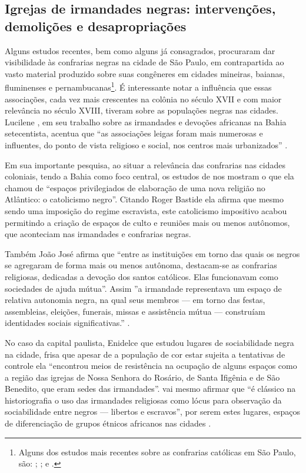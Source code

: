 \begin{refsection}
    \section{Igrejas de irmandades negras: intervenções, demolições e desapropriações}

    Alguns estudos recentes, bem como alguns já consagrados, procuraram dar visibilidade às confrarias negras na cidade de São Paulo, em contrapartida ao vasto material produzido sobre suas congêneres em cidades mineiras, baianas, fluminenses e pernambucanas\footnote{Alguns dos estudos mais recentes sobre as confrarias católicas em São Paulo, são: ; ; e .}. É interessante notar a influência que essas associações, cada vez mais crescentes na colônia no século XVII e com maior relevância no século XVIII, tiveram sobre as populações negras nas cidades. Lucilene \textcite{Reginaldo2011Rosarios}, em seu trabalho sobre as irmandades e devoções africanas na Bahia setecentista, acentua que ``as associações leigas foram mais numerosas e influentes, do ponto de vista religioso e social, nos centros mais urbanizados'' \cite[p.~25]{Reginaldo2011Rosarios}.

    Em sua importante pesquisa, ao situar a relevância das confrarias nas cidades coloniais, tendo a Bahia como foco central, os estudos de \textcite{Reginaldo2011Rosarios} nos mostram o que ela chamou de ``espaços privilegiados de elaboração de uma nova religião no Atlântico: o catolicismo negro''. Citando Roger Bastide ela afirma que mesmo sendo uma imposição do regime escravista, este catolicismo impositivo acabou permitindo a criação de espaços de culto e reuniões mais ou menos autônomos, que aconteciam nas irmandades e confrarias negras.
    
    Também João José \textcite{Reis1996Identidade} afirma que ``entre as instituições em torno das quais os negros se agregaram de forma mais ou menos autônoma, destacam-se as confrarias religiosas, dedicadas a devoção dos santos católicos. Elas funcionavam como sociedades de ajuda mútua''. Assim ''a irmandade representava um espaço de relativa autonomia negra, na qual seus membros --- em torno das festas, assembleias, eleições, funerais, missas e assistência mútua --- construíam identidades sociais significativas.'' \cite[p.~44]{Reis1996Identidade}.
    
    No caso da capital paulista, Enidelce \textcite{Bertin2010Sociabilidade} que estudou lugares de sociabilidade negra na cidade, frisa que apesar de a população de cor estar sujeita a tentativas de controle ela ``encontrou meios de resistência na ocupação de alguns espaços como a região das igrejas de Nossa Senhora do Rosário, de Santa Ifigênia e de São Benedito, que eram sedes das irmandades''. \textcite{Bertin2010Sociabilidade} vai mesmo afirmar que ``é clássico na historiografia o uso das irmandades religiosas como lócus para observação da sociabilidade entre negros --- libertos e escravos'', por serem estes lugares, espaços de diferenciação de grupos étnicos africanos nas cidades \cite[p.~127]{Bertin2010Sociabilidade}.
    

\end{refsection}
